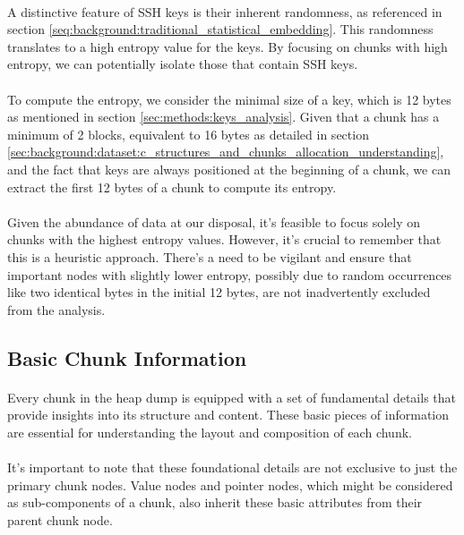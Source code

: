         \paragraph{}A distinctive feature of SSH keys is their inherent randomness, as referenced in section \ref{seq:background:traditional_statistical_embedding}. This randomness translates to a high entropy value for the keys. By focusing on chunks with high entropy, we can potentially isolate those that contain SSH keys.
        
        \paragraph{}To compute the entropy, we consider the minimal size of a key, which is 12 bytes as mentioned in section \ref{sec:methods:keys_analysis}. Given that a chunk has a minimum of 2 blocks, equivalent to 16 bytes as detailed in section \ref{sec:background:dataset:c_structures_and_chunks_allocation_understanding}, and the fact that keys are always positioned at the beginning of a chunk, we can extract the first 12 bytes of a chunk to compute its entropy.
        
        \paragraph{}Given the abundance of data at our disposal, it's feasible to focus solely on chunks with the highest entropy values. However, it's crucial to remember that this is a heuristic approach. There's a need to be vigilant and ensure that important nodes with slightly lower entropy, possibly due to random occurrences like two identical bytes in the initial 12 bytes, are not inadvertently excluded from the analysis.
    

\subsection{Basic Chunk Information}\label{seq:embedding:basic_chunk_information}

    \paragraph{}Every chunk in the heap dump is equipped with a set of fundamental details that provide insights into its structure and content. These basic pieces of information are essential for understanding the layout and composition of each chunk.

    \paragraph{}It's important to note that these foundational details are not exclusive to just the primary chunk nodes. Value nodes and pointer nodes, which might be considered as sub-components of a chunk, also inherit these basic attributes from their parent chunk node.

